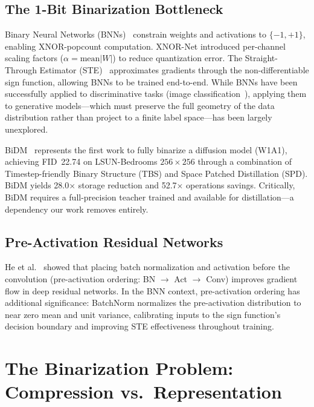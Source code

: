 \documentclass[conference]{IEEEtran}
\begin{document}
\subsection{The 1-Bit Binarization Bottleneck}

Binary Neural Networks
(BNNs)~\cite{hubara2016bnn,rastegari2016xnornet} constrain weights and activations to
$\{-1,+1\}$, enabling XNOR-popcount computation. XNOR-Net introduced per-channel scaling
factors ($\alpha = \text{mean}|W|$) to reduce quantization error. The Straight-Through
Estimator (STE)~\cite{bengio2013ste} approximates gradients through the
non-differentiable sign function, allowing BNNs to be trained end-to-end. While BNNs
have been successfully applied to discriminative tasks (image
classification~\cite{liu2020reactnet,martinez2020training}), applying them to generative
models---which must preserve the full geometry of the data distribution rather than
project to a finite label space---has been largely unexplored.

BiDM~\cite{bidm2024} represents the first work to fully binarize a diffusion model
(W1A1), achieving FID~22.74 on LSUN-Bedrooms $256{\times}256$ through a combination of
Timestep-friendly Binary Structure (TBS) and Space Patched Distillation (SPD). BiDM
yields 28.0$\times$ storage reduction and 52.7$\times$ operations savings. Critically,
BiDM requires a full-precision teacher trained and available for distillation---a
dependency our work removes entirely.

\subsection{Pre-Activation Residual Networks}

He et al.~\cite{he2016preact} showed that placing batch normalization and activation
before the convolution (pre-activation ordering: BN $\to$ Act $\to$ Conv) improves
gradient flow in deep residual networks. In the BNN context, pre-activation ordering has
additional significance: BatchNorm normalizes the pre-activation distribution to near
zero mean and unit variance, calibrating inputs to the sign function's decision boundary
and improving STE effectiveness throughout training.

\section{The Binarization Problem: Compression vs.\ Representation}
\end{document}
